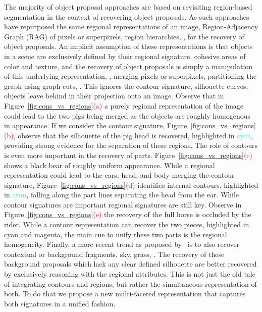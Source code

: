 The majority of object proposal approaches are based on revisiting region-based segmentation in the context of recovering object proposals. As such approaches have repurposed the same regional representations of an image, Region-Adjacency Graph (RAG) of pixels or superpixels, region hierarchies, \etc, for the recovery of object proposals. An implicit assumption of these representations is that objects in a scene are exclusively defined by their regional signature, cohesive areas of color and texture, and the recovery of object proposals is simply a manipulation of this underlying representation, \ie, merging pixels or superpixels, partitioning the graph using graph cuts, \etc. This ignores the contour signature, silhouette curves, objects leave behind in their projection onto an image. Observe that in Figure~\ref{fig:cons_vs_regions}\textcolor{red}{(a)} a purely regional representation of the image could lead to the two pigs being merged as the objects are roughly homogenous in appearance. If we consider the contour signature, Figure~\ref{fig:cons_vs_regions}\textcolor{red}{(b)}, observe that the silhouette of the pig head is recovered, highlighted in \textcolor{cyan}{cyan}, providing strong evidence for the separation of these regions. The role of contours is even more important in the recovery of parts. Figure~\ref{fig:cons_vs_regions}\textcolor{red}{(c)} shows a black bear of roughly uniform appearance. While a regional representation could lead to the ears, head, and body merging the contour signature, Figure~\ref{fig:cons_vs_regions}\textcolor{red}{(d)} identifies internal contours, highlighted in \textcolor{cyan}{cyan}, falling along the part lines separating the head from the ear. While contour signatures are important regional signatures are still key. Observe in Figure~\ref{fig:cons_vs_regions}\textcolor{red}{(e)} the recovery of the full horse is occluded by the rider. While a contour representation can recover the two pieces, highlighted in cyan and magenta, the main cue to unify these two parts is the regional homogeneity. Finally, a more recent trend as proposed by~\cite{Bonev:Yuille:ECCV14} is to also recover contextual or background fragments, sky, grass, \etc. The recovery of these background proposals which lack any clear defined silhouette are better recovered by exclusively reasoning with the regional attributes. This is not just the old tale of integrating contours and regions, but rather the simultaneous representation of both. To do that we propose a new multi-faceted representation that captures both signatures in a unified fashion. 

